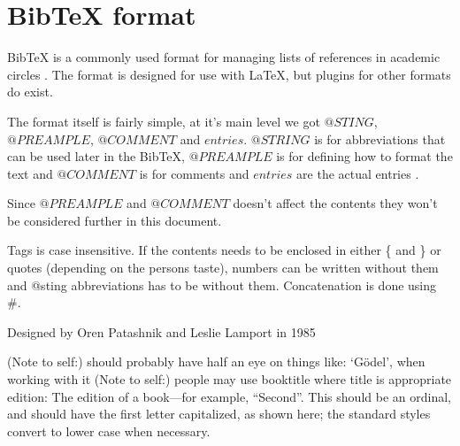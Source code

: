 \section{BibTeX format}
BibTeX is a commonly used format for managing lists of references in
academic circles .  The format is
designed for use with {\LaTeX}, but plugins for other formats do
exist. \autocite{bibtex_resource}

The format itself is fairly simple, at it's main level we got
$@STING$, $@PREAMPLE$, $@COMMENT$ and $entries$.  $@STRING$ is for
abbreviations that can be used later in the BibTeX, $@PREAMPLE$ is for
defining how to format the text and $@COMMENT$ is for comments and
$entries$ are the actual entries \autocite{bibtex_resource}.

Since $@PREAMPLE$ and $@COMMENT$ doesn't affect the contents they
won't be considered further in this document. 

Tags is case insensitive. If the contents needs to be enclosed in
either \{ and \} or quotes (depending on the persons taste), numbers
can be written without them and @sting abbreviations has to be without
them. Concatenation is done using \#.\autocite{bibtex_resource}

Designed by Oren Patashnik and Leslie Lamport in 1985

(Note to self:) should probably have half an eye on things like:  `G{\"o}del', when working with it
(Note to self:) people may use booktitle where title is appropriate
edition: The edition of a book---for example, ``Second''. This should be an ordinal, and should have the first letter capitalized, as shown here; the standard styles convert to lower case when necessary. \autocite{bibtex_description}

